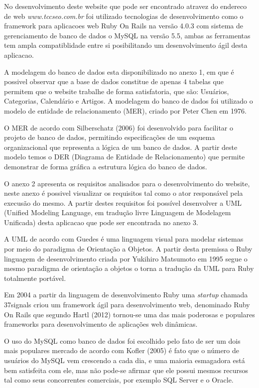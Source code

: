\documentclass[
	12pt,				%
	openright,			%
	twoside,			%
	a4paper,			%
	english,			%
	french,				%
	spanish,			%
	brazil				%
	]{abntex2}
\begin{document}
No desenvolvimento deste website que pode ser encontrado atravez do endereco de web \textit{www.tccseo.com.br} foi utilizado  tecnologias de desenvolvimento como o framework para aplicacoes web Ruby On Rails na versão 4.0.3 com sistema de gerenciamento de banco de dados o MySQL na versão 5.5, ambas as ferramentas tem ampla compatiblidade entre si posibilitando um desenvolvimento ágil desta aplicacao.

A modelagem do banco de dados esta disponibilizado no anexo 1, em que é possivel observar que a base de dados constitue de apenas 4 tabelas que permitem que o website trabalhe de forma satisfatoria, que são: Usuários, Categorias, Calendário e Artigos. A modelagem do banco de dados foi utilizado o modelo de entidade de relacionamento (MER), criado por Peter Chen em 1976. 

O MER de acordo com Silberschatz (2006) foi desenvolvido para facilitar o projeto de banco de dados, permitindo especificações de um esquema organizacional que representa a lógica de um banco de dados. A partir deste modelo temos o DER (Diagrama de Entidade de Relacionamento) que permite demonstrar de forma gráfica a estrutura lógica do banco de dados.

O anexo 2 apresenta os requisitos analisados para o desenvolvimento do website, neste anexo é possivel visualizar os requisitos tal como o ator responsável pela execusão do mesmo. A partir destes requisitos foi possível desenvolver a UML (Unified Modeling Language, em tradução livre Linguagem de Modelagem Unificada) desta aplicacao que pode ser encontrada no anexo 3.

A UML de acordo com Guedes é uma linguagem visual para modelar sistemas por meio do paradigma de Orientação a Objetos. A partir desta premissa o Ruby linguagem de desenvolvimento criada por Yukihiro Matsumoto em 1995 segue o mesmo paradigma de orientação a objetos o torna a tradução da UML para Ruby totalmente portável.

Em 2004 	a partir da linguagem de desenvolvimento Ruby uma \textit{startup} chamada 37signals criou um framework ágil  para desenvolvimento web, denominado Ruby On Rails que segundo Hartl (2012) tornou-se uma das mais poderosas e populares frameworks para desenvolvimento de aplicações web dinâmicas.

O uso do MySQL como banco de dados foi escolhido pelo fato de ser um dois mais populares mercado de acordo com Kofler (2005) é fato que o número de usuários do MySQL vem crescendo a cada dia, e uma maioria esmagadora está bem satisfeita com ele, mas não pode-se afirmar que ele possui mesmos recursos tal como seus concorrentes comerciais, por exemplo SQL Server e o Oracle.
\end{document}
